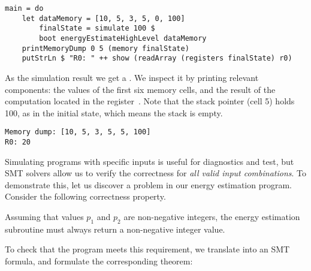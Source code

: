\vspace{1mm}
\begin{verbatim}
main = do
    let dataMemory = [10, 5, 3, 5, 0, 100]
        finalState = simulate 100 $
        boot energyEstimateHighLevel dataMemory
    printMemoryDump 0 5 (memory finalState)
    putStrLn $ "R0: " ++ show (readArray (registers finalState) r0)
\end{verbatim}
\vspace{1mm}

\noindent
As the simulation result we get a . We inspect it by
printing relevant components: the values of the first six memory cells, and the
result of the computation located in the register~. Note that the stack
pointer (cell 5) holds 100, as in the initial state, which means the stack is empty.

\vspace{1mm}
\begin{verbatim}
Memory dump: [10, 5, 3, 5, 5, 100]
R0: 20
\end{verbatim}
\vspace{1mm}

Simulating programs with specific inputs is useful for diagnostics and test, but
SMT solvers allow us to verify the correctness for \emph{all valid input
combinations}. To demonstrate this, let us discover a problem in our energy
estimation program. Consider the following correctness property.


\vspace{1mm}
\begin{tcolorbox}
Assuming that values $p_1$ and $p_2$ are non-negative integers, the energy
estimation subroutine must always return a non-negative integer value.
\end{tcolorbox}
\vspace{1mm}

To check that the program meets this requirement, we translate
 into an SMT formula,
and formulate the corresponding theorem:

